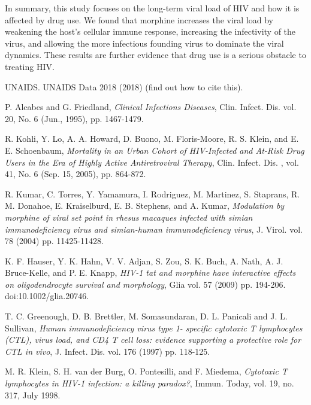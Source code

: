 \documentclass[11pt, oneside]{article}    %
\begin{document}
	In summary, this study focuses on the long-term viral load of HIV and how it is affected by drug use. We found that morphine increases the viral load by weakening the host's cellular immune response, increasing the infectivity of the virus, and allowing the more infectious founding virus to dominate the viral dynamics. These results are further evidence that drug use is a serious obstacle to treating HIV. 


\pagebreak

\begin{thebibliography}{99}
\itemsep 0pt\relax

UNAIDS. UNAIDS Data 2018 (2018) (find out how to cite this). %

P. Alcabes and G. Friedland, {\em Clinical Infections Diseases}, Clin. Infect. Dis. vol. 20, No. 6 (Jun., 1995), pp. 1467-1479.

R. Kohli, Y. Lo, A. A. Howard, D. Buono, M. Floris-Moore, R. S. Klein, and E. E. Schoenbaum, {\em Mortality in an Urban Cohort of HIV-Infected and At-Risk Drug Users in the Era of Highly Active Antiretroviral Therapy}, Clin. Infect. Dis. , vol. 41, No. 6 (Sep. 15, 2005), pp. 864-872.


R. Kumar, C. Torres, Y. Yamamura, I. Rodriguez, M. Martinez, S. Staprans, R. M. Donahoe, E. Kraiselburd, E. B. Stephens, and A. Kumar,  {\em Modulation by morphine of viral set point in rhesus macaques infected with simian immunodeficiency virus and simian-human immunodeficiency virus}, J. Virol. vol. 78 (2004) pp. 11425-11428.

K. F. Hauser, Y. K. Hahn, V. V. Adjan, S. Zou, S. K. Buch, A. Nath, A. J. Bruce-Kelle, and P. E. Knapp, {\em HIV-1 tat and morphine have interactive effects on oligodendrocyte survival and morphology},  Glia vol.  57 (2009) pp. 194-206. doi:10.1002/glia.20746.

T. C. Greenough, D. B. Brettler, M. Somasundaran, D. L. Panicali and J. L. Sullivan,  {\em Human immunodeficiency virus type 1- specific cytotoxic T lymphocytes (CTL), virus load, and CD4 T cell loss: evidence supporting a protective role for CTL in vivo}, J. Infect. Dis. vol. 176 (1997) pp. 118-125.

M. R. Klein, S. H. van der Burg, O. Pontesilli, and F. Miedema, {\em Cytotoxic T lymphocytes in HIV-1 infection: a killing paradox?}, Immun. Today, vol. 19, no. 317, July 1998.


\end{thebibliography}
\end{document}
